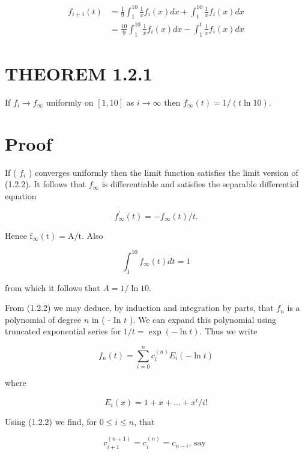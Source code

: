 \documentclass[10pt]{article}
\begin{document}
\begin{align*}
f_{i+1}(t) & =\frac{1}{9} \int_{1}^{10} \frac{1}{x} f_{i}(x) d x+\int_{t}^{10} \frac{1}{x} f_{i}(x) d x \\
& =\frac{10}{9} \int_{1}^{10} \frac{1}{x} f_{i}(x) d x-\int_{1}^{t} \frac{1}{x} f_{i}(x) d x \tag{1.2.2}
\end{align*}


\section*{THEOREM 1.2.1}
If $f_{i} \rightarrow f_{\infty}$ uniformly on $[1,10]$ as $i \rightarrow \infty$ then $f_{\infty}(t)=1 /(t \ln 10)$.

\section*{Proof}
If ( $f_{i}$ ) converges uniformly then the limit function satisfies the limit version of (1.2.2). It follows that $f_{\infty}$ is differentiable and satisfies the separable differential equation


\begin{equation*}
f_{\infty}^{\prime}(t)=-f_{\infty}(t) / t . \tag{1.2.4}
\end{equation*}


Hence $\mathrm{f}_{\infty}(\mathrm{t})=\mathrm{A} / \mathrm{t}$. Also

$$
\int_{1}^{10} f_{\infty}(t) d t=1
$$

from which it follows that $A=1 / \ln 10$.

From (1.2.2) we may deduce, by induction and integration by parts, that $f_{n}$ is a polynomial of degree $n$ in ( - In $t$ ). We can expand this polynomial using truncated exponential series for $1 / t=\exp (-\ln t)$. Thus we write


\begin{equation*}
f_{n}(t)=\sum_{i=0}^{n} c_{i}^{(n)} E_{i}(-\ln t) \tag{1.2.5}
\end{equation*}


where


\begin{equation*}
E_{i}(x)=1+x+\ldots+x^{i} / i! \tag{1.2.6}
\end{equation*}


Using (1.2.2) we find, for $0 \leqslant i \leqslant n$, that


\begin{equation*}
c_{i+1}^{(n+1)}=c_{i}^{(n)}=c_{n-i} \text {, say } \tag{1.2.7}
\end{equation*}
\end{document}
